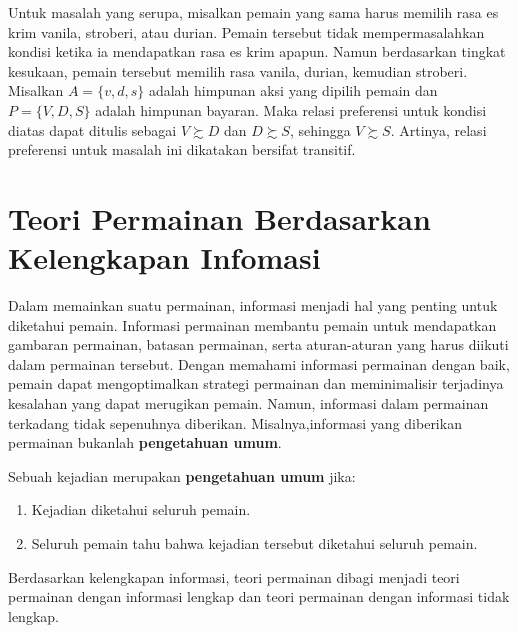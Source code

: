 Untuk masalah yang serupa, misalkan pemain yang sama harus memilih rasa es krim vanila, stroberi, atau durian. Pemain tersebut tidak mempermasalahkan kondisi ketika ia mendapatkan rasa es krim apapun.
Namun berdasarkan tingkat kesukaan, pemain tersebut memilih rasa vanila, durian, kemudian stroberi. Misalkan $A = \lbrace v, d, s\rbrace$ adalah himpunan aksi yang dipilih pemain  dan $P = \lbrace V, D, S\rbrace$ adalah himpunan bayaran. Maka relasi preferensi untuk kondisi diatas dapat ditulis sebagai $V \succsim D$ dan $D \succsim S$, sehingga $V \succsim S$. Artinya, relasi preferensi untuk masalah ini dikatakan bersifat transitif.


\section{Teori Permainan Berdasarkan Kelengkapan Infomasi}
Dalam memainkan suatu permainan, informasi menjadi hal yang penting untuk diketahui pemain. Informasi permainan membantu pemain untuk mendapatkan gambaran permainan, batasan permainan, serta aturan-aturan yang harus diikuti dalam permainan tersebut. Dengan memahami informasi permainan dengan baik, pemain dapat mengoptimalkan strategi permainan dan meminimalisir terjadinya kesalahan yang dapat merugikan pemain. Namun, informasi dalam permainan terkadang tidak sepenuhnya diberikan. Misalnya,informasi yang diberikan permainan bukanlah \textbf{pengetahuan umum}.

\begin{definisi}
    Sebuah kejadian merupakan \textbf{pengetahuan umum} jika:
    \begin{enumerate}
        \item Kejadian diketahui seluruh pemain.
        \item Seluruh pemain tahu bahwa kejadian tersebut diketahui seluruh pemain.
    \end{enumerate}
\end{definisi}

Berdasarkan kelengkapan informasi, teori permainan dibagi menjadi teori permainan dengan informasi lengkap dan teori permainan dengan informasi tidak lengkap.

